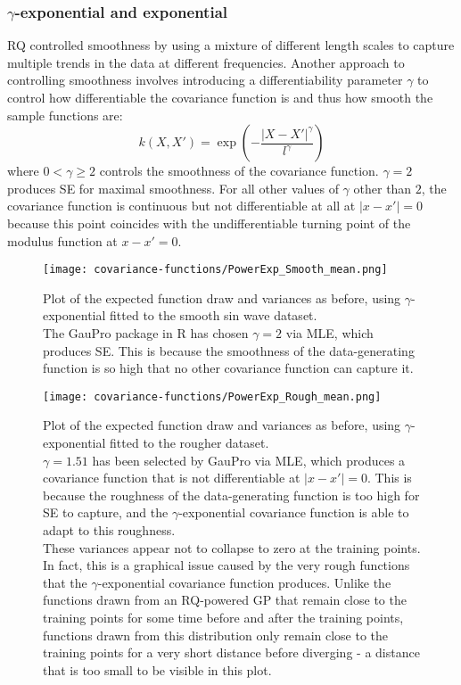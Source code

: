 \subsubsection{$\gamma$-exponential and exponential}
RQ controlled smoothness by using a mixture of different length scales to capture multiple trends in the data at different frequencies. Another approach to controlling smoothness involves introducing a differentiability parameter $\gamma$ to control how differentiable the covariance function is and thus how smooth the sample functions are:
\begin{equation*}
    k(X,X') = \exp \left(-\frac{|X - X'|^{\gamma}}{l^{\gamma}} \right)
\end{equation*}
where $0 < \gamma \geq 2$ controls the smoothness of the covariance function. 
$\gamma = 2$ produces SE for maximal smoothness. For all other values of $\gamma$ other than $2$, the covariance function is continuous but not differentiable at all at $|x - x'| = 0$ because this point coincides with the undifferentiable turning point of the modulus function at $x - x' = 0$.

\begin{figure}[H]
    \texttt{[image: covariance-functions/PowerExp\_Smooth\_mean.png]}
    \caption{
        Plot of the expected function draw and variances as before, using $\gamma$-exponential fitted to the smooth sin wave dataset. \\
        The GauPro package \cite{gaupro} in R has chosen $\gamma = 2$ via MLE, which produces SE. This is because the smoothness of the data-generating function is so high that no other covariance function can capture it.
    }
\end{figure}

\begin{figure}[H]
    \texttt{[image: covariance-functions/PowerExp\_Rough\_mean.png]}
    \caption{
        Plot of the expected function draw and variances as before, using $\gamma$-exponential fitted to the rougher dataset. \\
        $\gamma = 1.51$ has been selected by GauPro \cite{gaupro} via MLE, which produces a covariance function that is not differentiable at $|x - x'| = 0$. This is because the roughness of the data-generating function is too high for SE to capture, and the $\gamma$-exponential covariance function is able to adapt to this roughness. \\
        These variances appear not to collapse to zero at the training points. In fact, this is a graphical issue caused by the very rough functions that the $\gamma$-exponential covariance function produces. Unlike the functions drawn from an RQ-powered GP that remain close to the training points for some time before and after the training points, functions drawn from this distribution only remain close to the training points for a very short distance before diverging - a distance that is too small to be visible in this plot.     }
\end{figure}

